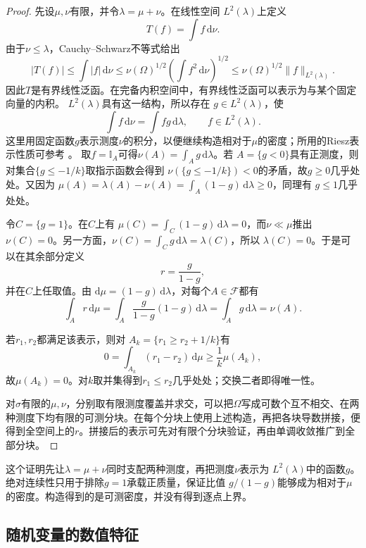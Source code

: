 \begin{proof}
先设\(\mu,\nu\)有限，并令\(\lambda=\mu+\nu\)。在线性空间
\(L^2(\lambda)\)上定义
\[
  T(f)=\int f\,\mathrm{d}\nu.
\]
由于\(\nu\leq\lambda\)，Cauchy--Schwarz不等式给出
\[
  |T(f)|
  \leq\int|f|\,\mathrm{d}\nu
  \leq\nu(\Omega)^{1/2}
       \left(\int f^2\,\mathrm{d}\nu\right)^{1/2}
  \leq\nu(\Omega)^{1/2}\lVert f\rVert_{L^2(\lambda)}.
\]
因此\(T\)是有界线性泛函。在完备内积空间中，有界线性泛函可以表示为与某个固定向量的内积。
\(L^2(\lambda)\)具有这一结构，所以存在
\(g\in L^2(\lambda)\)，使
\[
  \int f\,\mathrm{d}\nu=\int fg\,\mathrm{d}\lambda,
  \qquad f\in L^2(\lambda).
\]
这里用固定函数\(g\)表示测度\(\nu\)的积分，以便继续构造相对于\(\mu\)的密度；所用的Riesz表示性质可参考
。
取\(f=\mathbb{I}_A\)可得\(\nu(A)=\int_Ag\,\mathrm{d}\lambda\)。若
\(A=\{g<0\}\)具有正测度，则对集合\(\{g\leq-1/k\}\)取指示函数会得到
\(\nu(\{g\leq-1/k\})<0\)的矛盾，故\(g\geq0\)几乎处处。又因为
\(\mu(A)=\lambda(A)-\nu(A)=\int_A(1-g)\,\mathrm{d}\lambda\geq0\)，同理有
\(g\leq1\)几乎处处。

令\(C=\{g=1\}\)。在\(C\)上有
\(\mu(C)=\int_C(1-g)\,\mathrm{d}\lambda=0\)，而\(\nu\ll\mu\)推出
\(\nu(C)=0\)。另一方面，\(\nu(C)=\int_Cg\,\mathrm{d}\lambda=\lambda(C)\)，所以
\(\lambda(C)=0\)。于是可以在其余部分定义
\[
  r=\frac{g}{1-g},
\]
并在\(C\)上任取值。由
\(\mathrm{d}\mu=(1-g)\,\mathrm{d}\lambda\)，对每个\(A\in\mathcal{F}\)都有
\[
  \int_A r\,\mathrm{d}\mu
  =\int_A\frac{g}{1-g}(1-g)\,\mathrm{d}\lambda
  =\int_Ag\,\mathrm{d}\lambda
  =\nu(A).
\]

若\(r_1,r_2\)都满足该表示，则对
\(A_k=\{r_1\geq r_2+1/k\}\)有
\[
  0=\int_{A_k}(r_1-r_2)\,\mathrm{d}\mu
  \geq\frac{1}{k}\mu(A_k),
\]
故\(\mu(A_k)=0\)。对\(k\)取并集得到\(r_1\leq r_2\)几乎处处；交换二者即得唯一性。

对\(\sigma\)有限的\(\mu,\nu\)，分别取有限测度覆盖并求交，可以把\(\Omega\)写成可数个互不相交、在两种测度下均有限的可测分块。在每个分块上使用上述构造，再把各块导数拼接，便得到全空间上的\(r\)。拼接后的表示可先对有限个分块验证，再由单调收敛推广到全部分块。
\end{proof}

这个证明先让\(\lambda=\mu+\nu\)同时支配两种测度，再把测度\(\nu\)表示为
\(L^2(\lambda)\)中的函数\(g\)。绝对连续性只用于排除\(g=1\)承载正质量，保证比值
\(g/(1-g)\)能够成为相对于\(\mu\)的密度。构造得到的是可测密度，并没有得到逐点上界。

\subsection{随机变量的数值特征}
\label{sec:rv-features}

